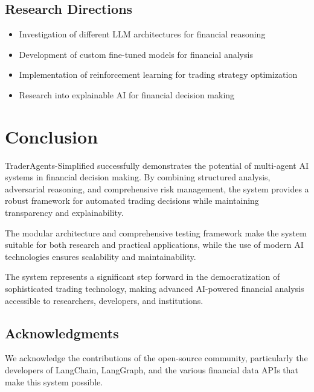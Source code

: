 \documentclass[11pt,a4paper]{article}
\begin{document}
\subsection{Research Directions}

\begin{itemize}
    \item Investigation of different LLM architectures for financial reasoning
    \item Development of custom fine-tuned models for financial analysis
    \item Implementation of reinforcement learning for trading strategy optimization
    \item Research into explainable AI for financial decision making
\end{itemize}

\section{Conclusion}

TraderAgents-Simplified successfully demonstrates the potential of multi-agent AI systems in financial decision making. By combining structured analysis, adversarial reasoning, and comprehensive risk management, the system provides a robust framework for automated trading decisions while maintaining transparency and explainability.

The modular architecture and comprehensive testing framework make the system suitable for both research and practical applications, while the use of modern AI technologies ensures scalability and maintainability.

The system represents a significant step forward in the democratization of sophisticated trading technology, making advanced AI-powered financial analysis accessible to researchers, developers, and institutions.

\subsection{Acknowledgments}

We acknowledge the contributions of the open-source community, particularly the developers of LangChain, LangGraph, and the various financial data APIs that make this system possible.
\end{document}
